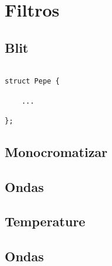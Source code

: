 \section{Filtros}

\subsection{Blit}
	
	\begin{codesnippet}
\begin{verbatim}

struct Pepe {

    ...

};

\end{verbatim}
\end{codesnippet}


\subsection{Monocromatizar}

\subsection{Ondas}

\subsection{Temperature}

\subsection{Ondas}

